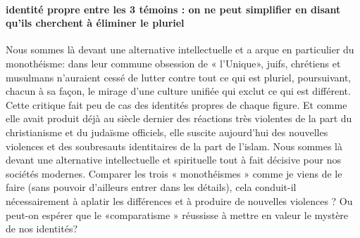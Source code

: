 \paragraph{identité propre entre les 3 témoins : on ne peut simplifier en disant qu'ils cherchent à éliminer le pluriel}Nous sommes là devant une alternative intellectuelle et a arque en particulier du monothéisme: dans leur commune obsession de « l'Unique», juifs, chrétiens et musulmans n'auraient cessé de lutter contre tout ce qui est pluriel, poursuivant, chacun à sa façon, le mirage d'une culture unifiée qui exclut ce qui est différent. Cette critique fait peu de cas des identités propres de chaque figure.
Et comme elle avait produit déjà au siècle dernier des réactions très violentes de la part du christianisme et du judaïsme officiels, elle suscite aujourd'hui des nouvelles violences et des soubresauts identitaires de la part de l'islam.
Nous sommes là devant une alternative intellectuelle et spirituelle tout à fait décisive pour nos sociétés modernes.
Comparer les trois « monothéismes » comme je viens de le faire (sans pouvoir d'ailleurs entrer dans les détails), cela conduit-il nécessairement à aplatir les différences et à produire de nouvelles violences ? Ou peut-on espérer que le «comparatisme » réussisse à mettre en valeur le mystère de nos identités? 

